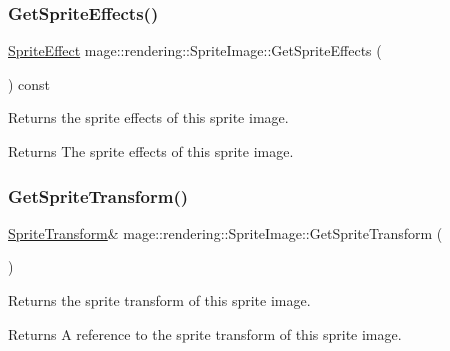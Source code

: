 \subsubsection{\texorpdfstring{Get\+Sprite\+Effects()}{GetSpriteEffects()}}
{\footnotesize\ttfamily \mbox{\hyperlink{namespacemage_1_1rendering_a4dbc3536c87b906f1d41d863ec458e78}{Sprite\+Effect}} mage\+::rendering\+::\+Sprite\+Image\+::\+Get\+Sprite\+Effects (\begin{DoxyParamCaption}{ }\end{DoxyParamCaption}) const\hspace{0.3cm}{\ttfamily [noexcept]}}

Returns the sprite effects of this sprite image.

\begin{DoxyReturn}{Returns}
The sprite effects of this sprite image. 
\end{DoxyReturn}
\mbox{\label{classmage_1_1rendering_1_1_sprite_image_a1f4b344e6c2087c7b68b65a8d719e5ef}} 
\subsubsection{\texorpdfstring{Get\+Sprite\+Transform()}{GetSpriteTransform()}\hspace{0.1cm}{\footnotesize\ttfamily [1/2]}}
{\footnotesize\ttfamily \mbox{\hyperlink{classmage_1_1_sprite_transform}{Sprite\+Transform}}\& mage\+::rendering\+::\+Sprite\+Image\+::\+Get\+Sprite\+Transform (\begin{DoxyParamCaption}{ }\end{DoxyParamCaption})\hspace{0.3cm}{\ttfamily [noexcept]}}

Returns the sprite transform of this sprite image.

\begin{DoxyReturn}{Returns}
A reference to the sprite transform of this sprite image. 
\end{DoxyReturn}
\mbox{\label{classmage_1_1rendering_1_1_sprite_image_a4d2fdf5ac9f60ef9bceb54055080a20b}} 
